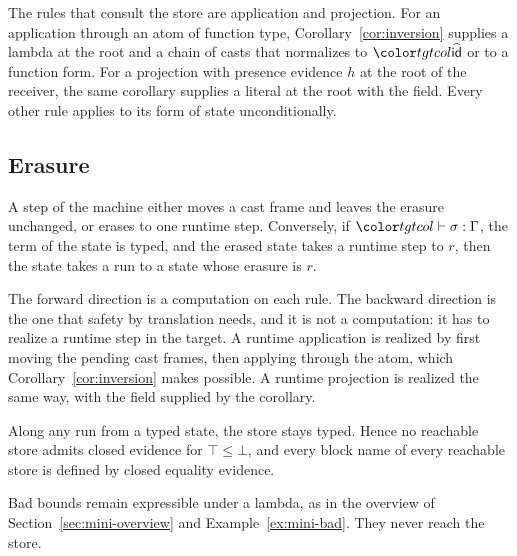 The rules that consult the store are application and projection. For an application through an atom of function type, Corollary~\ref{cor:inversion} supplies a lambda at the root and a chain of casts that normalizes to $\form{id}$ or to a function form. For a projection with presence evidence $h$ at the root of the receiver, the same corollary supplies a literal at the root with the field. Every other rule applies to its form of state unconditionally.

\subsection{Erasure}

\begin{theorem}
A step of the machine either moves a cast frame and leaves the erasure unchanged, or erases to one runtime step. Conversely, if $\storej{\sigma}{\Gamma}$, the term of the state is typed, and the erased state takes a runtime step to $r$, then the state takes a run to a state whose erasure is $r$.
\end{theorem}

The forward direction is a computation on each rule. The backward direction is the one that safety by translation needs, and it is not a computation: it has to realize a runtime step in the target. A runtime application is realized by first moving the pending cast frames, then applying through the atom, which Corollary~\ref{cor:inversion} makes possible. A runtime projection is realized the same way, with the field supplied by the corollary.

\begin{corollary}
Along any run from a typed state, the store stays typed. Hence no reachable store admits closed evidence for $\top \le \bot$, and every block name of every reachable store is defined by closed equality evidence.
\end{corollary}

Bad bounds remain expressible under a lambda, as in the overview of Section~\ref{sec:mini-overview} and Example~\ref{ex:mini-bad}. They never reach the store.
